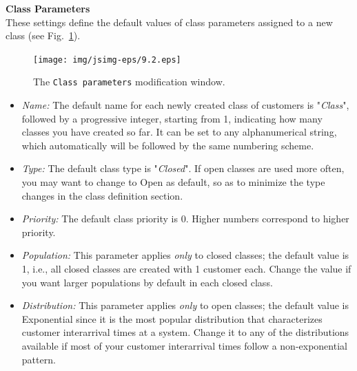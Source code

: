 \noindent \textbf{Class Parameters}\\
These settings define the default values of class parameters
assigned to a new class (see Fig.~\ref{fig:clparam}).
\begin{figure}[htb]
    \begin{center}
        \texttt{[image: img/jsimg-eps/9.2.eps]}
    \end{center}
    \caption{The \texttt{Class parameters} modification window.}
    \label{fig:clparam}
\end{figure}
\begin{itemize}
\item \emph{Name:} The default name for each newly created class
of customers is "\emph{Class}", followed by a progressive integer,
starting from 1, indicating how many classes you have created so
far. It can be set to any alphanumerical string, which
automatically will be followed by the same numbering scheme. \item
\emph{Type:} The default class type is "\emph{Closed}". If open
classes are used more often, you may want to change to Open as
default, so as to minimize the type changes in the class
definition section. \item \emph{Priority:} The default class
priority is 0. Higher numbers correspond to higher priority. \item
\emph{Population:} This parameter applies \emph{only} to closed
classes; the default value is 1, i.e., all closed classes are
created with 1 customer each. Change the value if you want larger
populations by default in each closed class. \item
\emph{Distribution:} This parameter applies \emph{only} to open
classes; the default value is Exponential since it is the most
popular distribution that characterizes customer interarrival
times at a system. Change it to any of the distributions available
if most of your customer interarrival times follow a
non-exponential pattern.
\end{itemize}

